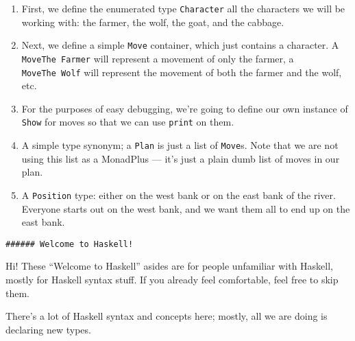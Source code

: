 \documentclass[]{article}
\begin{document}
\begin{enumerate}
\def\labelenumi{\arabic{enumi}.}
\tightlist
\item
  First, we define the enumerated type \texttt{Character} all the characters we
  will be working with: the farmer, the wolf, the goat, and the cabbage.
\item
  Next, we define a simple \texttt{Move} container, which just contains a
  character. A \texttt{MoveThe\ Farmer} will represent a movement of only the
  farmer, a \texttt{MoveThe\ Wolf} will represent the movement of both the
  farmer and the wolf, etc.
\item
  For the purposes of easy debugging, we're going to define our own instance of
  \texttt{Show} for moves so that we can use \texttt{print} on them.
\item
  A simple type synonym; a \texttt{Plan} is just a list of \texttt{Move}s. Note
  that we are not using this list as a MonadPlus --- it's just a plain dumb list
  of moves in our plan.
\item
  A \texttt{Position} type: either on the west bank or on the east bank of the
  river. Everyone starts out on the west bank, and we want them all to end up on
  the east bank.
\end{enumerate}

\begin{verbatim}
###### Welcome to Haskell!
\end{verbatim}

Hi! These ``Welcome to Haskell'' asides are for people unfamiliar with Haskell,
mostly for Haskell syntax stuff. If you already feel comfortable, feel free to
skip them.

There's a lot of Haskell syntax and concepts here; mostly, all we are doing is
declaring new types.
\end{document}
